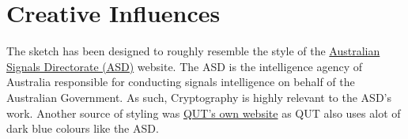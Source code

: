 \documentclass[12pt,a4paper]{article}
\begin{document}
		\begin{center}
			\par
		\end{center}
	
	\newpage

	\section{Creative Influences}
		The sketch has been designed to roughly resemble the style of the 
		\href{https://www.asd.gov.au/}{Australian Signals Directorate (ASD)} website. 
		The ASD is the intelligence agency of Australia responsible for conducting 
		signals intelligence on behalf of the Australian Government. As such, 
		Cryptography is highly relevant to the ASD's work. Another source of styling was 
		\href{https://www.qut.edu.au/study/information-technology?undergraduate}{QUT's own website} 
		as QUT also uses alot of dark blue colours like the ASD.\\
		
\end{document}
